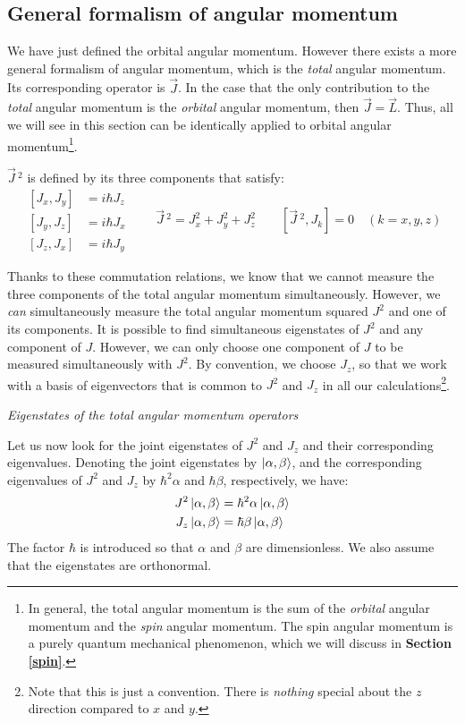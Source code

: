 \subsection{General formalism of angular momentum}

We have just defined the orbital angular momentum. However there exists a more general formalism of angular momentum, which is the \textit{total} angular momentum. Its corresponding operator is $\vec{J}$. In the case that the only contribution to the \textit{total} angular momentum is the \textit{orbital} angular momentum, then $\vec{J} = \vec{L}$. Thus, all we will see in this section can be identically applied to orbital angular momentum\footnote{In general, the total angular momentum is the sum of the \textit{orbital} angular momentum and the \textit{spin} angular momentum. The spin angular momentum is a purely quantum mechanical phenomenon, which we will discuss in \textbf{Section \ref{spin}}.}.

$\vec{J}\,^2$ is defined by its three components that satisfy:
\begin{equation} \label{eq:commutation_relations_angular_momentum}
    \begin{split}
        [J_x, J_y] &= i\hbar J_z \\
        [J_y, J_z] &= i\hbar J_x \\
        [J_z, J_x] &= i\hbar J_y
    \end{split}\qquad \vec{J}\,^2 = J_x^2 + J_y^2 + J_z^2\qquad [\vec{J}\,^2, J_k] = 0\quad (k = x, y, z)
\end{equation}

Thanks to these commutation relations, we know that we cannot measure the three components of the total angular momentum simultaneously. However, we \textit{can} simultaneously measure the total angular momentum squared $J^2$ and one of its components. It is possible to find simultaneous eigenstates of $J^2$ and any component of $J$. However, we can only choose one component of $J$ to be measured simultaneously with $J^2$. By convention, we choose $J_z$, so that we work with a basis of eigenvectors that is common to $J^2$ and $J_z$ in all our calculations\footnote{Note that this is just a convention. There is \textit{nothing} special about the $z$ direction compared to $x$ and $y$.}.

\textit{Eigenstates of the total angular momentum operators}

Let us now look for the joint eigenstates of $J^2$ and $J_z$ and their corresponding eigenvalues. Denoting the joint eigenstates by $\ket{\alpha, \beta}$, and the corresponding eigenvalues of $J^2$ and $J_z$ by $\hbar^2\alpha$ and $\hbar \beta$, respectively, we have:
\begin{equation} \label{eq:angular_momentum_eigenstates}
    \begin{split}
        J^2\ket{\alpha, \beta} &= \hbar^2\alpha\ket{\alpha, \beta} \\
        J_z\ket{\alpha, \beta} &= \hbar\beta\ket{\alpha, \beta}
    \end{split}
\end{equation}
The factor $\hbar$ is introduced so that $\alpha$ and $\beta$ are dimensionless. We also assume that the eigenstates are orthonormal.

